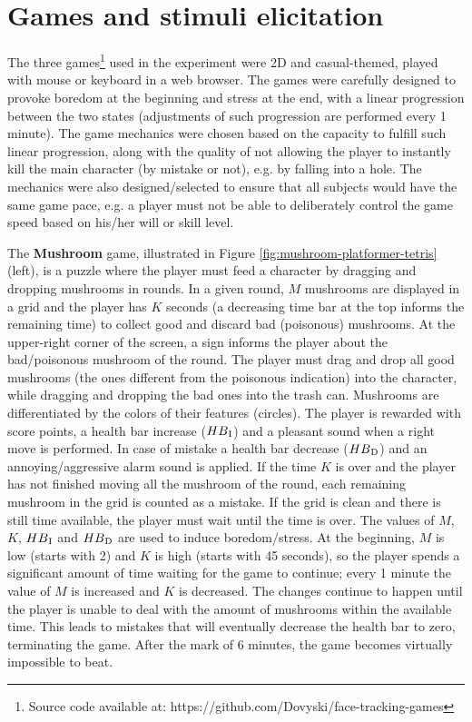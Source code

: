 \section{Games and stimuli elicitation}

The three games\footnote{Source code available at: https://github.com/Dovyski/face-tracking-games} used in the experiment were 2D and casual-themed, played with mouse or keyboard in a web browser. The games were carefully designed to provoke boredom at the beginning and stress at the end, with a linear progression between the two states (adjustments of such progression are performed every 1 minute). The game mechanics were chosen based on the capacity to fulfill such linear progression, along with the quality of not allowing the player to instantly kill the main character (by mistake or not), e.g. by falling into a hole. The mechanics were also designed/selected to ensure that all subjects would have the same game pace, e.g. a player must not be able to deliberately control the game speed based on his/her will or skill level.

The \textbf{Mushroom} game, illustrated in Figure \ref{fig:mushroom-platformer-tetris} (left), is a puzzle where the player must feed a character by dragging and dropping mushrooms in rounds. In a given round, $M$ mushrooms are displayed in a grid and the player has $K$ seconds (a decreasing time bar at the top informs the remaining time) to collect good and discard bad (poisonous) mushrooms. At the upper-right corner of the screen, a sign informs the player about the bad/poisonous mushroom of the round. The player must drag and drop all good mushrooms (the ones different from the poisonous indication) into the character, while dragging and dropping the bad ones into the trash can. Mushrooms are differentiated by the colors of their features (circles). The player is rewarded with score points, a health bar increase ($HB\textsubscript{I}$) and a pleasant sound when a right move is performed. In case of mistake a health bar decrease ($HB\textsubscript{D}$) and an annoying/aggressive alarm sound is applied. If the time $K$ is over and the player has not finished moving all the mushroom of the round, each remaining mushroom in the grid is counted as a mistake. If the grid is clean and there is still time available, the player must wait until the time is over. The values of $M$, $K$, $HB\textsubscript{I}$ and $HB\textsubscript{D}$ are used to induce boredom/stress. At the beginning, $M$ is low (starts with 2) and $K$ is high (starts with 45 seconds), so the player spends a significant amount of time waiting for the game to continue; every 1 minute the value of $M$ is increased and $K$ is decreased. The changes continue to happen until the player is unable to deal with the amount of mushrooms within the available time. This leads to mistakes that will eventually decrease the health bar to zero, terminating the game. After the mark of 6 minutes, the game becomes virtually impossible to beat.

